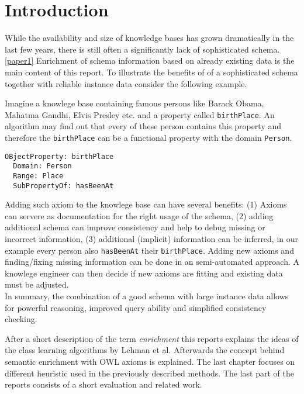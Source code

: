 \section{Introduction}

While the availability and size of knowledge bases has grown dramatically in the
last few years, there is still often a significantly lack of sophisticated
schema.\ref{paper1}
Enrichment of schema information based on already existing data is the main
content of this report.
To illustrate the benefits of of a sophisticated schema together with reliable
instance data consider the following example.

\begin{example}
Imagine a knowlege base containing famous persons like Barack Obama, Mahatma
Gandhi, Elvis Presley etc. and a property called \texttt{birthPlace}. An
algorithm may find out that every of these person contains this property and
therefore the \texttt{birthPlace} can be a functional property with the domain
\texttt{Person}.
\vspace{0.55 cm}
\begin{verbatim}
OBjectProperty: birthPlace
  Domain: Person
  Range: Place
  SubPropertyOf: hasBeenAt
\end{verbatim}
\end{example}
\vspace{-0.4 cm}

Adding such axiom to the knowlege base can have several benefits\cite{paper2}:
(1) Axioms can servere as documentation for the right usage of the schema, (2) adding
additional schema can improve consistency and help to debug missing or incorrect
information, (3) additional (implicit) information can be inferred, in our
example every person also \texttt{hasBeenAt} their \texttt{birthPlace}.
Adding new axioms and finding/fixing missing information can be done in an
semi-automated approach. A knowlege engineer can then decide if new axioms are
fitting and existing data must be adjusted.\\
In summary, the combination of a good schema with large instance data allows for
powerful reasoning, improved query ability and simplified consistency checking. 

After a short description of the term \emph{enrichment} this reports explains
the ideas of the class learning algorithms by Lehman et al. Afterwards the
concept behind semantic enrichment with OWL axioms is explained. The last
chapter focuses on different heuristic used in the previously described methods.
The last part of the reports consists of a short evaluation and related work.
